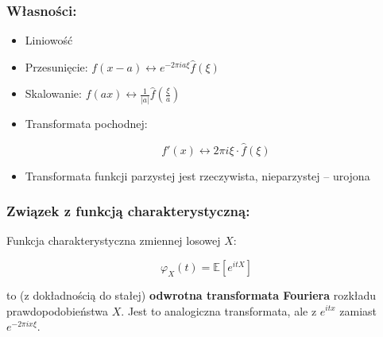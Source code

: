 \subsubsection*{Własności:}
\begin{itemize}
    \item Liniowość
    \item Przesunięcie: $f(x - a) \leftrightarrow e^{-2\pi i a \xi} \hat{f}(\xi)$
    \item Skalowanie: $f(ax) \leftrightarrow \frac{1}{|a|} \hat{f}\left(\frac{\xi}{a}\right)$
    \item Transformata pochodnej:

    $$
    f'(x) \leftrightarrow 2\pi i \xi \cdot \hat{f}(\xi)
    $$
    \item Transformata funkcji parzystej jest rzeczywista, nieparzystej -- urojona
\end{itemize}

\subsubsection*{Związek z funkcją charakterystyczną:}
Funkcja charakterystyczna zmiennej losowej $X$:

$$
\varphi_X(t) = \mathbb{E}[e^{itX}]
$$

to (z dokładnością do stałej) \textbf{odwrotna transformata Fouriera} rozkładu prawdopodobieństwa $X$.
Jest to analogiczna transformata, ale z $e^{itx}$ zamiast $e^{-2\pi i x \xi}$.
